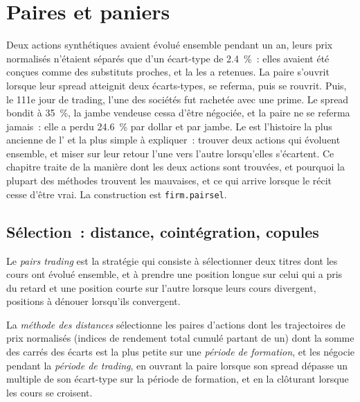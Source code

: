\chapter{Paires et paniers}\label{ch:s1:pairs-and-baskets}

Deux actions synthétiques avaient évolué ensemble pendant un an, leurs prix normalisés n'étaient séparés que d'un écart-type de 2.4~\%~: elles avaient été conçues comme
des substituts proches, et la  les a retenues. La paire s'ouvrit lorsque leur spread atteignit deux écarts-types, se referma, puis se rouvrit. Puis, le 111e jour de trading, l'une des sociétés fut rachetée avec une prime. Le spread bondit à 35~\%, la jambe vendeuse cessa d'être négociée, et la paire
ne se referma jamais~: elle a perdu 24.6~\% par dollar et par jambe. Le  est l'histoire la plus ancienne de l' et la plus simple à expliquer~: trouver deux actions
qui évoluent ensemble, et miser sur leur retour l'une vers l'autre lorsqu'elles s'écartent. Ce chapitre traite de la manière dont les deux actions sont trouvées, et pourquoi la plupart des méthodes
trouvent les mauvaises, et ce qui arrive lorsque le récit cesse d'être vrai. La construction est \texttt{firm.pairsel}.

\section{Sélection~: distance, cointégration, copules}

\begin{definition}\label{def:s1:pairs-and-baskets:pairs}
Le \emph{pairs trading} est la stratégie qui consiste à sélectionner deux titres dont les cours ont évolué ensemble, et à prendre une position longue sur celui qui a pris du retard
et une position courte sur l'autre lorsque leurs cours divergent, positions à dénouer lorsqu'ils convergent.
\end{definition}

\begin{definition}\label{def:s1:pairs-and-baskets:distance}
La \emph{méthode des distances} sélectionne les paires d'actions dont les trajectoires de prix normalisés (indices de rendement total cumulé partant de
un) dont la somme des carrés des écarts est la plus petite sur une \emph{période de formation}, et les négocie pendant la
\emph{période de trading}, en ouvrant la paire lorsque son spread dépasse un multiple de son écart-type sur la période de formation, et en la clôturant
lorsque les cours se croisent.
\end{definition}

